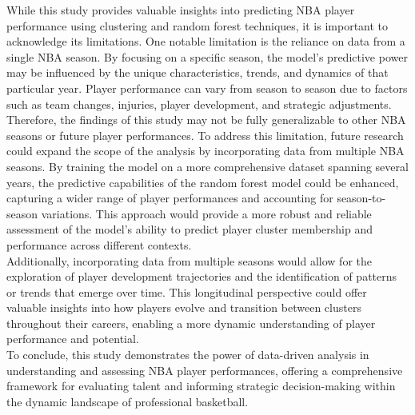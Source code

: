 \documentclass[fleqn,10pt]{SelfArx} %
\begin{document}
While this study provides valuable insights into predicting NBA player performance using clustering and random forest techniques, it is important to acknowledge its limitations. One notable limitation is the reliance on data from a single NBA season. By focusing on a specific season, the model's predictive power may be influenced by the unique characteristics, trends, and dynamics of that particular year. Player performance can vary from season to season due to factors such as team changes, injuries, player development, and strategic adjustments. Therefore, the findings of this study may not be fully generalizable to other NBA seasons or future player performances. To address this limitation, future research could expand the scope of the analysis by incorporating data from multiple NBA seasons. By training the model on a more comprehensive dataset spanning several years, the predictive capabilities of the random forest model could be enhanced, capturing a wider range of player performances and accounting for season-to-season variations. This approach would provide a more robust and reliable assessment of the model's ability to predict player cluster membership and performance across different contexts.\\
Additionally, incorporating data from multiple seasons would allow for the exploration of player development trajectories and the identification of patterns or trends that emerge over time. This longitudinal perspective could offer valuable insights into how players evolve and transition between clusters throughout their careers, enabling a more dynamic understanding of player performance and potential.\\
To conclude, this study demonstrates the power of data-driven analysis in understanding and assessing NBA player performances, offering a comprehensive framework for evaluating talent and informing strategic decision-making within the dynamic landscape of professional basketball.
\newpage
\end{document}
